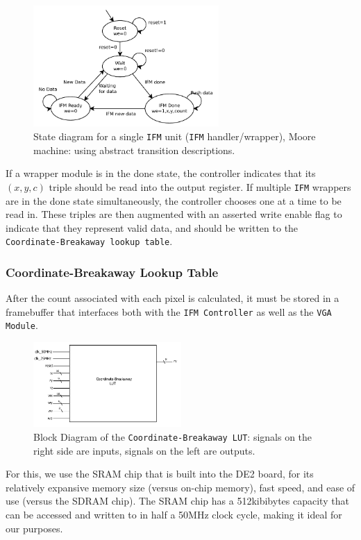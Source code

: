 \documentclass{article}
\begin{document}
\begin{figure}[H]
  \centering
    \includegraphics[width=200pt]{state_diagrams/ifmunit.pdf}
  \caption{State diagram for a single \texttt{IFM} unit (\texttt{IFM} handler/wrapper),
    Moore machine: using abstract transition descriptions.}
\end{figure}

If a wrapper module is in the done state, the controller indicates that its $(x, y, c)$ triple should be read into
the output register. If multiple \texttt{IFM} wrappers are in the done state simultaneously, the controller chooses one at a
time to be read in. These triples are then augmented with an asserted write enable flag to indicate that they represent
valid data, and should be written to the \texttt{Coordinate-Breakaway lookup table}. 


\subsubsection{Coordinate-Breakaway Lookup Table}

After the count associated with each pixel is calculated, it must be
stored in a framebuffer that interfaces both with the \texttt{IFM
Controller} as well as the \texttt{VGA Module}.

\begin{figure}[H]
  \centering
    \includegraphics[width=160pt]{block_diagrams/clut.pdf}
  \caption{Block Diagram of the \texttt{Coordinate-Breakaway LUT}: signals on
    the right side are inputs, signals on the left are outputs.}
\end{figure}

For this, we use the SRAM chip that is built into the DE2 board, for
its relatively expansive memory size (versus on-chip memory), fast
speed, and ease of use (versus the SDRAM chip). The SRAM chip has a 
512kibibytes capacity that can be accessed and written to in half a 50MHz
clock cycle, making it ideal for our purposes.
\end{document}

